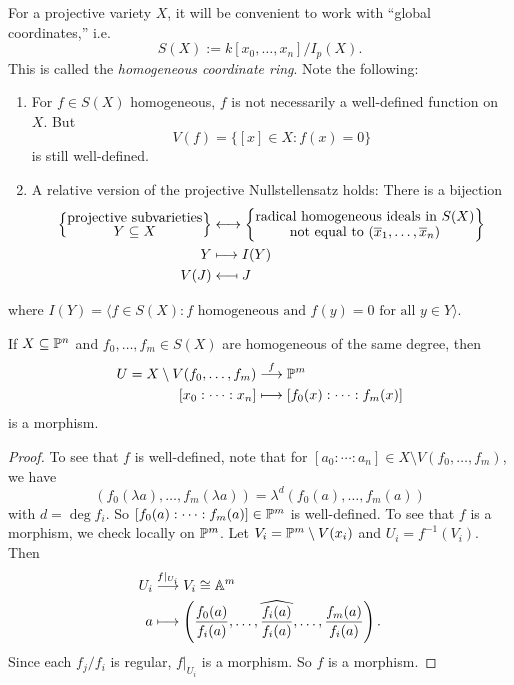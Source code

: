 \begin{remark}
  For a projective variety $X$, it will
  be convenient to work with
  ``global coordinates,'' i.e.
  \[
    S(X)
    := k[x_0, \dots, x_n] / I_p(X).
  \]
  This is called the
  \emph{homogeneous coordinate ring}.
  Note the following:
  \begin{enumerate}
    \item For $f \in S(X)$
      homogeneous, $f$ is not
      necessarily a well-defined
      function on $X$. But
      \[
        V(f) = \{[x] \in X : f(x) = 0\}
      \]
      is still well-defined.
    \item A relative version of the
      projective Nullstellensatz holds:
      There is a bijection
      \begin{align*}
        \left\{
          \substack{\displaystyle\text{projective subvarieties} \\ \displaystyle Y \subseteq X}
        \right\}
        &\longleftrightarrow
        \left\{
          \substack{\displaystyle\text{radical homogeneous ideals in $S(X)$} \\ \displaystyle \text{not equal to $(\overline{x}_1, \dots, \overline{x}_n)$}}
        \right\} \\
        Y &\longmapsto I(Y) \\
        V(J) &\mathrel{\reflectbox{\ensuremath{\longmapsto}}} J
      \end{align*}
  \end{enumerate}
  where $I(Y) = \langle f \in S(X) : f \text{ homogeneous and } f(y) = 0 \text{ for all } y \in Y \rangle$.
\end{remark}

\begin{lemma}
  If $X \subseteq \mathbb{P}^n$ and
  $f_0, \dots, f_m \in S(X)$ are homogeneous
  of the same degree, then
  \begin{align*}
    U = X \setminus V(f_0, \dots, f_m)
    &\overset{f}{\longrightarrow} \mathbb{P}^m \\
    [x_0 : \cdots : x_n]
    &\longmapsto [f_0(x) : \cdots : f_m(x)]
  \end{align*}
  is a morphism.
\end{lemma}

\begin{proof}
  To see that $f$ is well-defined,
  note that for $[a_0 : \cdots : a_n] \in X \setminus V(f_0, \dots, f_m)$,
  we have
  \[
    (f_0(\lambda a), \dots, f_m(\lambda a))
    = \lambda^d (f_0(a), \dots, f_m(a))
  \]
  with $d = \deg f_i$.
  So $[f_0(a) : \cdots : f_m(a)] \in \mathbb{P}^m$
  is well-defined. To see that $f$ is a
  morphism, we check locally on
  $\mathbb{P}^m$. Let
  $V_i = \mathbb{P}^m \setminus V(x_i)$
  and $U_i = f^{-1}(V_i)$.
  Then
  \begin{align*}
    U_i
    &\overset{f|_{U_i}}{\longrightarrow} V_i \cong \mathbb{A}^m \\
    a &\longmapsto
    \left(
      \frac{f_0(a)}{f_i(a)},
      \dots,
      \widehat{\frac{f_i(a)}{f_i(a)}},
      \dots,
      \frac{f_m(a)}{f_i(a)}
    \right).
  \end{align*}
  Since each $f_j / f_i$ is regular,
  $f|_{U_i}$ is a morphism. So
  $f$ is a morphism.
\end{proof}


